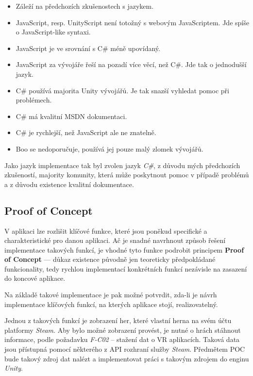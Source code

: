 \begin{itemize}
\tightlist
\item
  Záleží na předchozích zkušenostech s jazykem.
\item
  JavaScript, resp. UnityScript není totožný s webovým JavaScriptem. Jde
  spíše o JavaScript-like syntaxi.
\item
  JavaScript je ve srovnání s C\# méně upovídaný.
\item
  JavaScript za vývojáře řeší na pozadí více věcí, než C\#. Jde tak o
  jednodušší jazyk.
\item
  C\# používá majorita Unity vývojářů. Je tak snazší vyhledat pomoc při
  problémech.
\item
  C\# má kvalitní MSDN dokumentaci.
\item
  C\# je rychlejší, než JavaScript ale ne znatelně.
\item
  Boo se nedoporučuje, používá jej pouze malý zlomek vývojářů.
\end{itemize}

Jako jazyk implementace tak byl zvolen jazyk \emph{C\#}, z důvodu mých
předchozích zkušeností, majority komunity, která může poskytnout pomoc v
případě problémů a z důvodu existence kvalitní dokumentace.

\subsection{Proof of Concept}\label{proof-of-concept}

V aplikaci lze rozlišit klíčové funkce, které jsou poněkud specifické a
charakteristické pro danou aplikaci. Ač je snadné navrhnout způsob
řešení implementace takových funkcí, je vhodné tyto funkce podrobit
principem \textbf{Proof of Concept} --- důkaz existence původně jen
teoreticky předpokládané funkcionality, tedy rychlou implementací
konkrétních funkcí nezávisle na zasazení do koncové aplikace.

Na základě takové implementace je pak možné potvrdit, zda-li je návrh
implementace klíčových funkcí, na kterých aplikace stojí,
realizovatelný.

Jednou z takových funkcí je zobrazení her, které vlastní herna na svém
účtu platformy \emph{Steam}. Aby bylo možné zobrazení provést, je nutné
o hrách stáhnout informace, podle požadavku \emph{F-C02} -- stažení dat
o VR aplikacích. Taková data jsou přístupná pomocí některého z API
rozhraní služby \emph{Steam}. Předmětem POC bude takový zdroj dat nalézt
a implementovat práci s takovým zdrojem do enginu \emph{Unity}.

